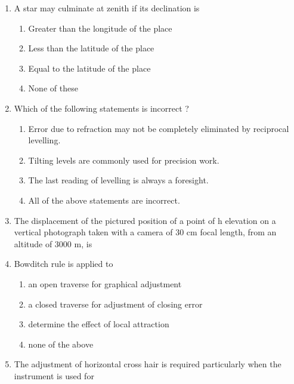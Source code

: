 \documentclass[11pt,a4paper]{article}
\begin{document}
\begin{enumerate}
\begin{enumerate}[label=\Alph*.]
\end{enumerate}
\item{A star may culminate at zenith if its declination is}
\begin{enumerate}[label=\Alph*.]
\item{Greater than the longitude of the place}
\item{Less than the latitude of the place}
\item{Equal to the latitude of the place}
\item{None of these}
\end{enumerate}
\item{Which of the following statements is incorrect ?}
\begin{enumerate}[label=\Alph*.]
\item{Error due to refraction may not be completely eliminated by reciprocal levelling.}
\item{Tilting levels are commonly used for precision work.}
\item{The last reading of levelling is always a foresight.}
\item{All of the above statements are incorrect.}
\end{enumerate}
\item{The displacement of the pictured position of a point of h elevation on a vertical photograph taken with a camera of 30 cm focal length, from an altitude of 3000 m, is}
\\\begin{enumerate*}[itemjoin=\qquad, label=\Alph*.]
\item{4.4 mm}
\item{5.5 mm}
\item{6.5 mm}
\item{7.5 mm}
\end{enumerate*}
\item{Bowditch rule is applied to}
\begin{enumerate}[label=\Alph*.]
\item{an open traverse for graphical adjustment}
\item{a closed traverse for adjustment of closing error}
\item{determine the effect of local attraction}
\item{none of the above}
\end{enumerate}
\item{The adjustment of horizontal cross hair is required particularly when the instrument is used for}
\begin{enumerate}[label=\Alph*.]

\end{enumerate}
\end{enumerate}
\end{document}
